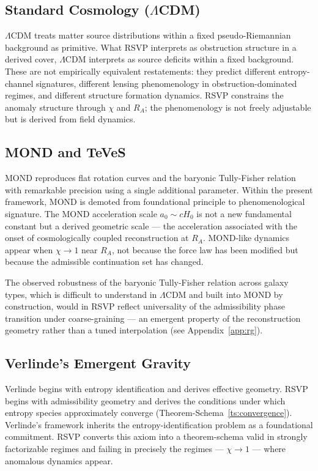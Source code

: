 \documentclass[11pt, a4paper]{article}
\theoremstyle{plain}
\theoremstyle{definition}
\theoremstyle{remark}
\newcommand{\RA}{R_{\!A}}
\begin{document}
\subsection{Standard Cosmology ($\Lambda$CDM)}

$\Lambda$CDM treats matter source distributions within a fixed pseudo-Riemannian
background as primitive. What RSVP interprets as obstruction structure in a derived
cover, $\Lambda$CDM interprets as source deficits within a fixed background. These
are not empirically equivalent restatements: they predict different entropy-channel
signatures, different lensing phenomenology in obstruction-dominated regimes, and
different structure formation dynamics. RSVP constrains the anomaly structure through
$\chi$ and $\RA$; the phenomenology is not freely adjustable but is derived from
field dynamics.

\subsection{MOND and TeVeS}

MOND \cite{milgrom1983} reproduces flat rotation curves and the baryonic
Tully-Fisher relation \cite{mcgaugh2011} with remarkable precision using a single
additional parameter. Within the present framework, MOND is demoted from foundational
principle to phenomenological signature. The MOND acceleration scale $a_0 \sim cH_0$
is not a new fundamental constant but a derived geometric scale --- the acceleration
associated with the onset of cosmologically coupled reconstruction at $\RA$.
MOND-like dynamics appear when $\chi \to 1$ near $\RA$, not because the force law
has been modified but because the admissible continuation set has changed.

The observed robustness of the baryonic Tully-Fisher relation \cite{mcgaugh2011}
across galaxy types, which is difficult to understand in $\Lambda$CDM and built into
MOND by construction, would in RSVP reflect universality of the admissibility phase
transition under coarse-graining --- an emergent property of the reconstruction
geometry rather than a tuned interpolation (see Appendix~\ref{app:rg}).

\subsection{Verlinde's Emergent Gravity}

Verlinde \cite{verlinde2011,verlinde2017} begins with entropy identification and
derives effective geometry. RSVP begins with admissibility geometry and derives the
conditions under which entropy species approximately converge
(Theorem-Schema~\ref{ts:convergence}). Verlinde's framework inherits the
entropy-identification problem \cite{jaynes1957} as a foundational commitment. RSVP
converts this axiom into a theorem-schema valid in strongly factorizable regimes and
failing in precisely the regimes --- $\chi \to 1$ --- where anomalous dynamics appear.
\end{document}
